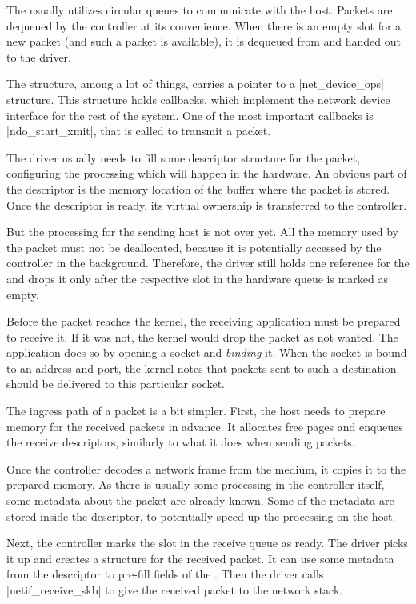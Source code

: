 The  usually utilizes circular queues to communicate with the host.
Packets are dequeued by the controller at its convenience. When there is an
empty slot for a new packet (and such a packet is available), it is dequeued
from  and handed out to the driver.

The \netdev{} structure, among a lot of things, carries a pointer to
a \struct|net_device_ops| structure. This structure holds callbacks, which
implement the network device interface for the rest of the system. One of the
most important callbacks is \fnc|ndo_start_xmit|, that is called to transmit a packet.

The driver usually needs to fill some descriptor structure for the packet,
configuring the processing which will happen in the hardware. An obvious part
of the descriptor is the memory location of the buffer where the packet is
stored. Once the descriptor is ready, its virtual ownership is transferred to
the controller.

But the processing for the sending host is not over yet. All the memory used by
the packet must not be deallocated, because it is potentially accessed by the
controller in the background. Therefore, the driver still holds one reference
for the \skb{} and drops it only after the respective slot in the hardware
queue is marked as empty.

Before the packet reaches the kernel, the receiving application must be
prepared to receive it. If it was not, the kernel would drop the packet as
not wanted. The application does so by opening a socket and \emph{binding} it.
When the socket is bound to an address and port, the kernel notes that packets
sent to such a destination should be delivered to this particular socket.

The ingress path of a packet is a bit simpler. First, the host needs to prepare
memory for the received packets in advance. It allocates free pages and
enqueues the receive descriptors, similarly to what it does when sending
packets.

Once the controller decodes a network frame from the medium, it copies it to
the prepared memory. As there is usually some processing in the controller
itself, some metadata about the packet are already known. Some of the metadata
are stored inside the descriptor, to potentially speed up the processing on the
host.

Next, the controller marks the slot in the receive queue as ready. The driver
picks it up and creates a \skb{} structure for the received packet. It can use
some metadata from the descriptor to pre-fill fields of the \skb{}. Then the
driver calls \fnc|netif_receive_skb| to give the received packet to the network
stack.

